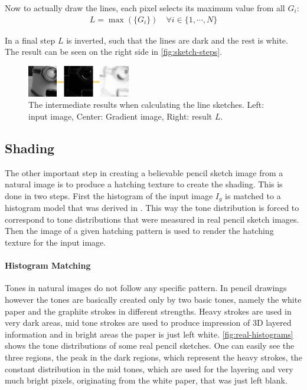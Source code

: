 Now to actually draw the lines, each pixel selects its maximum value from all
$G_i$:
\begin{align}
 L = \max(\lbrace G_i\rbrace) \quad \forall i \in  \lbrace1,\cdots,N\rbrace
 \label{eq:L}
\end{align}

In a final step $L$ is inverted, such that the lines are dark and the rest is
white. The result can be seen on the right side in \autoref{fig:sketch-steps}.

\begin{figure}[htb]
  \centering
  \includegraphics[width=0.4\textwidth]{images/sketch-steps.png}
  \caption{The intermediate results when calculating the line sketches. Left:
  input image, Center: Gradient image, Right: result $L$.}
  \label{fig:sketch-steps}
\end{figure}

\subsection{Shading}
The other important step in creating a believable pencil sketch image from a
natural image is to produce a hatching texture to create the shading. This is
done in two steps. First the histogram of the input image $I_g$ is matched to a
histogram model that was derived in \cite{mainPaper}. This way the tone
distribution is forced to correspond to tone distributions that were measured in
real pencil sketch images. Then the image of a given hatching pattern is used to
render the hatching texture for the input image. 

\paragraph{Histogram Matching}
Tones in natural images do not follow any specific pattern. In pencil drawings
however the tones are basically created only by two basic tones, namely the
white paper and the graphite strokes in different strengths. Heavy strokes are
used in very dark areas, mid tone strokes are used to produce impression of 3D
layered information and in bright areas the paper is just left white.
\autoref{fig:real-histograms} shows the tone distributions of some real pencil
sketches. One can easily see the three regions, the peak in the dark regions,
which represent the heavy strokes, the constant distribution in the mid tones,
which are used for the layering and very much bright pixels, originating from
the white paper, that was just left blank.

